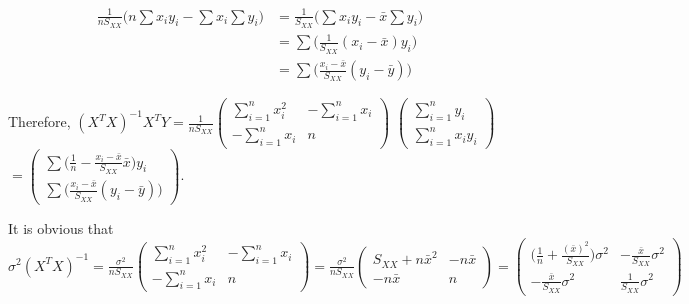 \documentclass[fleqn]{article}
\begin{document}
\begin{equation*}
\begin{split}
\frac{1}{nS_{XX}}\Big( n\sum x_i y_i - \sum x_i \sum y_i \Big) &= \frac{1}{S_{XX}} \Big( \sum x_i y_i - \bar{x} \sum y_i \Big)\\
&= \sum \Big( \frac{1}{S_{XX}} (x_i - \bar{x}) y_i \Big)\\
&= \sum \Big( \frac{x_i - \bar{x}}{S_{XX}} (y_i - \bar{y}) \Big)
\end{split}
\end{equation*}

Therefore, $(X^TX)^{-1}X^TY = \frac{1}{nS_{XX}}\left(\begin{matrix}
\sum_{i=1}^{n}x_i^2 & -\sum_{i=1}^{n}x_i \\ 
-\sum_{i=1}^{n}x_i & n
\end{matrix}\right) $ $\left(\begin{matrix}
\sum_{i=1}^{n}y_i\\ 
\sum_{i=1}^{n}x_i y_i
\end{matrix}\right)$ $= \left(\begin{matrix}
\sum \Big( \frac{1}{n} - \frac{x_i - \bar{x}}{S_{XX}} \bar{x}\Big) y_i\\
\sum \Big( \frac{x_i - \bar{x}}{S_{XX}} (y_i - \bar{y}) \Big)
\end{matrix} \right)$.

It is obvious that $\sigma^2 (X^TX)^{-1} = \frac{\sigma^2}{nS_{XX}}\left(\begin{matrix}
\sum_{i=1}^{n}x_i^2 & -\sum_{i=1}^{n}x_i \\ 
-\sum_{i=1}^{n}x_i & n
\end{matrix}\right) = \frac{\sigma^2}{nS_{XX}}\left(\begin{matrix}
S_{XX} + n\bar{x}^2 & -n\bar{x}\\
-n\bar{x} & n
\end{matrix}\right)= \left(\begin{matrix}
\Big(\frac{1}{n} + \frac{(\bar{x})^2}{S_{XX}}\Big) \sigma^2 & -\frac{\bar{x}}{S_{XX}}\sigma^2 \\
-\frac{\bar{x}}{S_{XX}}\sigma^2 & \frac{1}{S_{XX}}\sigma^2
\end{matrix}\right)$
\end{document}
